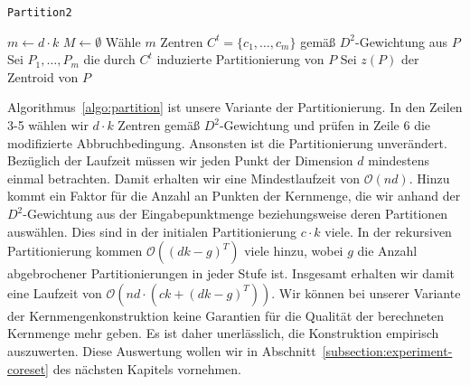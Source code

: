 \begin{algorithm}
\caption{\texttt{Partition2}}
\label{algo:partition}
	\DontPrintSemicolon
	
	\BlankLine
	
	$m \leftarrow d \cdot k$\;
	$M \leftarrow \emptyset$\;
	Wähle $m$ Zentren $C^t = \{c_1, \dots, c_m\}$ gemäß $D^2$-Gewichtung aus $P$\;
	Sei $P_1, \dots, P_m$ die durch $C^t$ induzierte Partitionierung von $P$\;
	Sei $z(P)$ der Zentroid von $P$\;
\end{algorithm}
Algorithmus~\ref{algo:partition} ist unsere Variante der Partitionierung. In den Zeilen 3-5 wählen wir $d \cdot k$ Zentren
gemäß $D^2$-Gewichtung und prüfen in Zeile 6 die modifizierte Abbruchbedingung. Ansonsten ist die Partitionierung unverändert.
\absatz
Bezüglich der Laufzeit müssen wir jeden Punkt der Dimension $d$ mindestens einmal betrachten. Damit erhalten wir eine
Mindestlaufzeit von $\mathcal{O}(nd)$. Hinzu kommt ein Faktor für die Anzahl an Punkten der Kernmenge, die wir anhand der
$D^2$-Gewichtung aus der Eingabepunktmenge beziehungsweise deren Partitionen auswählen. Dies sind in der initialen
Partitionierung $c \cdot k$ viele. In der rekursiven Partitionierung kommen $\mathcal{O}( (dk - g)^T )$ viele hinzu, wobei
$g$ die Anzahl abgebrochener Partitionierungen in jeder Stufe ist. Insgesamt erhalten wir damit eine Laufzeit von
$\mathcal{O}\left( nd \cdot \left( ck + \left( dk - g \right)^T \right) \right)$.
\absatz
Wir können bei unserer Variante der Kernmengenkonstruktion keine Garantien für die Qualität der berechneten
Kernmenge mehr geben. Es ist daher unerlässlich, die Konstruktion empirisch auszuwerten. Diese Auswertung wollen wir in
Abschnitt~\ref{subsection:experiment-coreset} des nächsten Kapitels vornehmen.